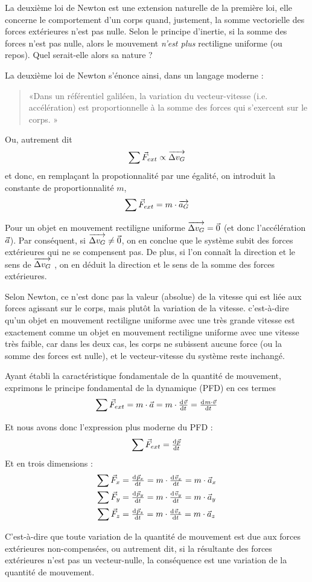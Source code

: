 \documentclass[11pt,a4paper]{article}
\begin{document}
La deuxième loi de Newton est une extension naturelle de la première loi, elle concerne le comportement d’un corps quand, justement, la somme vectorielle des forces extérieures n’est pas nulle.  Selon le principe d’inertie, si la somme des forces n’est pas nulle, alors le mouvement \textit{n’est plus} rectiligne uniforme (ou repos).  Quel serait-elle alors sa nature ?

La deuxième loi de Newton s’énonce ainsi, dans un langage moderne :
\begin{quote}
«Dans un référentiel galiléen, la variation du vecteur-vitesse (i.e. accélération) est proportionnelle à la somme des forces qui s’exercent sur le corps. »
\end{quote}

Ou, autrement dit 
\[
\sum \vec{F}_{ext} \propto \overrightarrow{\Delta v_G}
\]
et donc, en remplaçant la propotionnalité par une égalité, on introduit la constante de proportionnalité $m$, 
\[
\sum \vec{F}_{ext} = m\cdot\overrightarrow{a_G}
\]

Pour un objet en mouvement rectiligne uniforme $\overrightarrow{\Delta v_G}=\Vec{0}$ (et donc l’accélération $\vec{a}$). Par conséquent, si $\overrightarrow{\Delta v_G}\ne\Vec{0}$, on en conclue que le système subit des forces extérieures qui ne se compensent pas.  De plus, si l'on connaît la direction et le sens de $\overrightarrow{\Delta v_G}$ , on en déduit la direction et le sens de la somme des forces extérieures.  

Selon Newton, ce n’est donc pas la valeur (absolue) de la vitesse qui est liée aux forces agissant sur le corps, mais plutôt la variation de la vitesse.  c'est-à-dire qu'un objet en mouvement rectiligne uniforme avec une très grande vitesse est exactement comme un objet en mouvement rectiligne uniforme avec une vitesse très faible, car dans les deux cas, les corps ne subissent aucune force (ou la somme des forces est nulle), et le vecteur-vitesse du système reste inchangé. 

Ayant établi la caractéristique fondamentale de la quantité de mouvement, exprimons le principe fondamental de la dynamique (PFD) en ces termes 
\[
\sum \vec{F}_{ext} = m\cdot\va = m\cdot\od{\vv}{t} = \od{m\cdot\vv}{t}
\]
\begin{shaded}
Et nous avons donc l'expression plus moderne du PFD : 
\[
\sum \vec{F}_{ext} = \od{\vp}{t}
\]
Et en trois dimensions : 
\begin{align*}
   \sum \vec{F}_x &= \od{\vp_x}{t} = m\cdot\od{\vv_x}{t} = m\cdot\va_x \\
   \sum \vec{F}_y &= \od{\vp_y}{t} = m\cdot\od{\vv_y}{t} = m\cdot\va_y \\
   \sum \vec{F}_z &= \od{\vp_z}{t} = m\cdot\od{\vv_z}{t} = m\cdot\va_z 
\end{align*}
\end{shaded}
C’est-à-dire que toute variation de la quantité de mouvement est due aux forces extérieures non-compensées, ou autrement dit, si la résultante des forces extérieures n’est pas un vecteur-nulle, la conséquence est une variation de la quantité de mouvement.  
\end{document}
